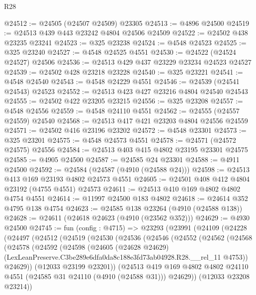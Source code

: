 \begin{lexlean}{R28}
\begin{coremodule}
@24512 := @24505 (@24507 @24509) @23305
@24513 := @4896 @24500
@24519 := @24513 @439 @443 @23242 @4804 @24506 @24509
@24522 := @24502 @438 @23235 @23241
@24523 := @325 @23238
@24524 := @4548 @24523
@24525 := @325 @23240
@24527 := @4548 @24525 @4551
@24530 := @24522 (@24524 @24527) @24506
@24536 := @24513 @429 @437 @23229 @23234 @24523 @24527
@24539 := @24502 @428 @23218 @23228
@24540 := @325 @23221
@24541 := @4548 @24540
@24543 := @4548 @24229 @4551
@24546 := @24539 (@24541 @24543) @24523
@24552 := @24513 @423 @427 @23216 @4804 @24540 @24543
@24555 := @24502 @422 @23205 @23215
@24556 := @325 @23208
@24557 := @4548 @24556
@24559 := @4548 @24110 @4551
@24562 := @24555 (@24557 @24559) @24540
@24568 := @24513 @417 @421 @23203 @4804 @24556 @24559
@24571 := @24502 @416 @23196 @23202
@24572 := @4548 @23301
@24573 := @325 @23201
@24575 := @4548 @24573 @4551
@24578 := @24571 (@24572 @24575) @24556
@24584 := @24513 @403 @415 @4802 @23195 @23301 @24575
@24585 := @4905 @24500
@24587 := @24585 @24 @23301
@24588 := @4911 @24500
@24592 := @24584 (@24587 (@4910 (@24588 @24)))
@24598 := @24513 @413 @169 @23193 @4802 @24573 @4551
@24605 := @24501 @408 @412 @4804 @23192 (@4755 @4551) @24573
@24611 := @24513 @410 @169 @4802 @4802 @4754 @4551
@24614 := @11997 @24500 @183 @4802
@24618 := @24614 @352 @4795 @138 @4754
@24623 := @24585 @138 @23264 (@4910 (@24588 @138))
@24628 := @24611 (@24618 @24623 (@4910 (@23562 @352)))
@24629 := @4930 @24500
@24745 := fun (config : @4715) =>
  @23293
    (@23991
      (@24109
        (@24228
          (@24497
            (@24512
              (@24519
                (@24530
                  (@24536
                    (@24546
                      (@24552
                        (@24562
                          (@24568
                            (@24578
                              (@24592
                                (@24598
                                  (@24605
                                    (@24628 @24629)
                                    (LexLeanPreserve.C3be289e6dfa0da8c188e3fd73ab04928.R28.__rel_11
                                      @4753))
                                  @24629))
                              (@12033 @23199 @23201))
                            (@24513
                              @419
                              @169
                              @4802
                              @4802
                              @24110
                              @4551
                              (@24585 @31 @24110 (@4910 (@24588 @31)))
                              @24629))
                          (@12033 @23208 @23214))

\end{coremodule}
\end{lexlean}
